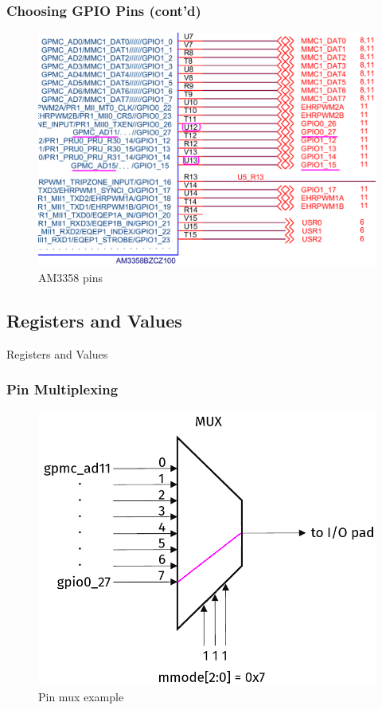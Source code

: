 \documentclass[aspectratio=169,usenames,dvipsnames]{beamer}
\newcounter{cont}
\begin{document}
\begin{frame}
  \frametitle{Choosing GPIO Pins (cont'd)}
  \begin{figure}
    \centering
    \includegraphics[scale=0.2]{images/soc-pins.png}
    \caption{AM3358 pins}
  \end{figure}
  \vspace*{-10mm}
\end{frame}

\subsection{Registers and Values}

\begin{frame}[standout]
  Registers and Values
\end{frame}

\begin{frame}
  \frametitle{Pin Multiplexing}
  \begin{figure}
    \centering
    \includegraphics[scale=0.3]{images/mux.png}
    \caption{Pin mux example}
  \end{figure}
\end{frame}
\end{document}
